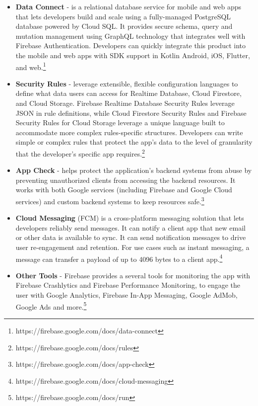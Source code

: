 \begin{itemize}
	\item \textbf{Data Connect} - is a relational database service for mobile and web apps that lets developers build and scale using a fully-managed PostgreSQL database powered by Cloud SQL. It provides secure schema, query and mutation management using GraphQL technology that integrates well with Firebase Authentication. Developers can quickly integrate this product into the mobile and web apps with SDK support in Kotlin Android, iOS, Flutter, and web.\footnote{https://firebase.google.com/docs/data-connect}
	\item \textbf{Security Rules} - leverage extensible, flexible configuration languages to define what data users can access for Realtime Database, Cloud Firestore, and Cloud Storage. Firebase Realtime Database Security Rules leverage JSON in rule definitions, while Cloud Firestore Security Rules and Firebase Security Rules for Cloud Storage leverage a unique language built to accommodate more complex rules-specific structures. Developers can write simple or complex rules that protect the app's data to the level of granularity that the developer's specific app requires.\footnote{https://firebase.google.com/docs/rules}
	\item \textbf{App Check} - helps protect the application's backend systems from abuse by preventing unauthorized clients from accessing the backend resources. It works with both Google services (including Firebase and Google Cloud services) and custom backend systems to keep resources safe.\footnote{https://firebase.google.com/docs/app-check}
	\item \textbf{Cloud Messaging} (FCM) is a cross-platform messaging solution that lets developers reliably send messages. It can notify a client app that new email or other data is available to sync. It can send notification messages to drive user re-engagement and retention. For use cases such as instant messaging, a message can transfer a payload of up to 4096 bytes to a client app.\footnote{https://firebase.google.com/docs/cloud-messaging}
	\item \textbf{Other Tools } - Firebase provides a several tools for monitoring the app with Firebase Crashlytics and Firebase Performance Monitoring, to engage the user with Google Analytics, Firebase In-App Messaging, Google AdMob, Google Ads and more.\footnote{https://firebase.google.com/docs/run}
\end{itemize}


